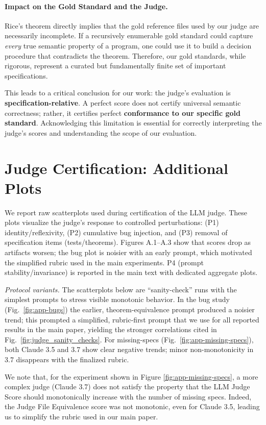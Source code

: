 \documentclass{article}
\begin{document}
\paragraph{Impact on the Gold Standard and the Judge.}
Rice's theorem directly implies that the gold reference files used by our judge are necessarily incomplete. If a recursively enumerable gold standard could capture \emph{every} true semantic property of a program, one could use it to build a decision procedure that contradicts the theorem. Therefore, our gold standards, while rigorous, represent a curated but fundamentally finite set of important specifications.

This leads to a critical conclusion for our work: the judge's evaluation is \textbf{specification-relative}. A perfect score does not certify universal semantic correctness; rather, it certifies perfect \textbf{conformance to our specific gold standard}. Acknowledging this limitation is essential for correctly interpreting the judge's scores and understanding the scope of our evaluation.


\section{Judge Certification: Additional Plots}\label{app:judge-cert}
We report raw scatterplots used during certification of the LLM judge. These plots visualize the judge’s response to controlled perturbations: (P1) identity/reflexivity, (P2) cumulative bug injection, and (P3) removal of specification items (tests/theorems). Figures A.1–A.3 show that scores drop as artifacts worsen; the bug plot is noisier with an early prompt, which motivated the simplified rubric used in the main experiments. P4 (prompt stability/invariance) is reported in the main text with dedicated aggregate plots.

\textit{Protocol variants.} The scatterplots below are “sanity-check” runs with the simplest prompts to stress visible monotonic behavior. In the bug study (Fig.~\ref{fig:app-bugs}) the earlier, theorem-equivalence prompt produced a noisier trend; this prompted a simplified, rubric-first prompt that we use for all reported results in the main paper, yielding the stronger correlations cited in Fig.~\ref{fig:judge_sanity_checks}. For missing-specs (Fig.~\ref{fig:app-missing-specs}), both Claude 3.5 and 3.7 show clear negative trends; minor non-monotonicity in 3.7 disappears with the finalized rubric.

We note that, for the experiment shown in Figure \ref{fig:app-missing-specs}, a more complex judge (Claude 3.7) does not satisfy the property that the LLM Judge Score should monotonically increase with the number of missing specs. Indeed, the Judge File Equivalence score was not monotonic, even for Claude 3.5, leading us to simplify the rubric used in our main paper.
\end{document}
